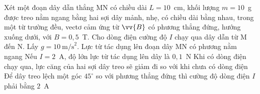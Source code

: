 	\begin{ex}%
		Xét một đoạn dây dẫn thẳng MN có chiều dài $L=10$~cm, khối lượng $m=10$~g được treo nằm ngang bằng hai sợi dây mảnh, nhẹ, có chiều dài bằng nhau, trong một từ trường đều, vectơ cảm ứng từ $\vv{B}$ có phương thẳng đứng, hướng xuống dưới, với $B=0{,}5$~T. Cho dòng điện cường độ $I$ chạy qua dây dẫn từ M đến N. Lấy $g=10~\text{m/s}^2$.
		\choiceTFt
		{\True Lực từ tác dụng lên đoạn dây MN có phương nằm ngang}
		{\True Nếu $I=2$~A, độ lớn lực từ tác dụng lên dây là $0{,}1$~N}
		{Khi có dòng điện chạy qua, lực căng của hai sợi dây treo sẽ giảm đi so với khi chưa có dòng điện}
		{\True Để dây treo lệch một góc $45^\circ$ so với phương thẳng đứng thì cường độ dòng điện $I$ phải bằng $2$~A}
	\end{ex}

